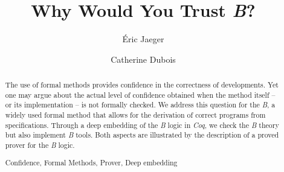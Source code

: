 \documentclass{llncs}
\newcommand{\keywords}[1]{\par\addvspace\baselineskip
\noindent\keywordname\enspace\ignorespaces#1}
\begin{document}
\mainmatter              



\title{Why Would You Trust \emph{B}?}


\author{\'Eric Jaeger \and Catherine Dubois}



\maketitle



\begin{abstract}
The use of formal methods provides confidence in the correctness of developments. Yet one may 
argue about the actual level of confidence obtained when the method itself -- or its 
implementation -- is not formally checked. We address this question for the \emph{B}, a widely 
used formal method that allows for the derivation of correct programs from specifications. 
Through a deep embedding of the \emph{B} logic in \emph{Coq}, we check the \emph{B} theory but 
also implement \emph{B} tools. Both aspects are illustrated by the description of a proved 
prover for the \emph{B} logic.
\keywords{Confidence, Formal Methods, Prover, Deep embedding}
\end{abstract}



\newcommand{\NAT}{\ensuremath{\mathbb{N}}}

\newcommand{\choice}{\ensuremath{\talloblong}}
\newcommand{\guard}{\ensuremath{\Longrightarrow}}

\newcommand{\rulename}[1]{\ensuremath{\:{\scriptstyle{[{#1}]}}}}

\newcommand{\Bidx}{\ensuremath{\mathbb{I}}}
\newcommand{\dbzero}{\ensuremath{\text{0}}}
\newcommand{\dbone}{\ensuremath{\text{1}}}
\newcommand{\dbtwo}{\ensuremath{\text{2}}}
\newcommand{\dbthree}{\ensuremath{\text{3}}}
\newcommand{\dbfour}{\ensuremath{\text{4}}}
\newcommand{\dbfive}{\ensuremath{\text{5}}}
\end{document}
